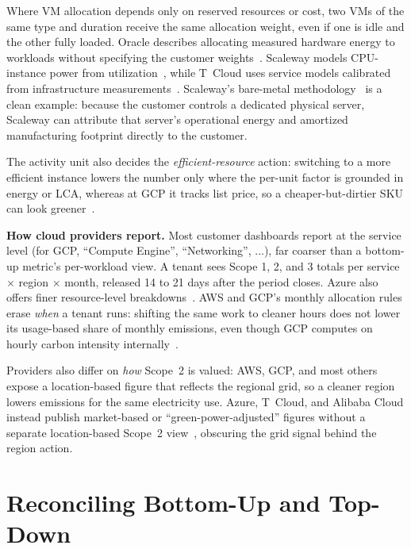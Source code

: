 \documentclass[sigconf,screen,nonacm]{acmart}
\newcommand{\parag}[1]{\vspace{2mm}\noindent\textbf{#1.}\hspace{2mm}}
\begin{document}
Where VM allocation depends only on reserved resources or cost, two VMs of the same type and duration receive the same allocation weight, even if one is idle and the other fully loaded.
Oracle describes allocating measured hardware energy to workloads without specifying the customer weights~\cite{oracle-emissions-management}.
Scaleway models CPU-instance power from utilization~\cite{scaleway-instances-footprint}, while T~Cloud uses service models calibrated from infrastructure measurements~\cite{tcloud-sustainability-release,tcloud-sustainability-dashboard}.
Scaleway's bare-metal methodology~\cite{scaleway-baremetal-footprint} is a clean example: because the customer controls a dedicated physical server, Scaleway can attribute that server’s operational energy and amortized manufacturing footprint directly to the customer.

The activity unit also decides the \emph{efficient-resource} action: switching to a more efficient instance lowers the number only where the per-unit factor is grounded in energy or LCA, whereas at GCP it tracks list price, so a cheaper-but-dirtier SKU can look greener~\cite{schneider-mattia-2024}.

\parag{How cloud providers report}
Most customer dashboards report at the service level (for GCP, ``Compute Engine'', ``Networking'', ...), far coarser than a bottom-up metric's per-workload view.
A tenant sees Scope 1, 2, and 3 totals per service $\times$ region $\times$ month, released 14 to 21 days after the period closes.
Azure also offers finer resource-level breakdowns~\cite{azure-carbon-overview}.
AWS and GCP's monthly allocation rules erase \emph{when} a tenant runs: shifting the same work to cleaner hours does not lower its usage-based share of monthly emissions, even though GCP computes on hourly carbon intensity internally~\cite{aws-ccft-model3,schneider-mattia-2024}.

Providers also differ on \emph{how} Scope~2 is valued: AWS, GCP, and most others expose a location-based figure that reflects the regional grid, so a cleaner region lowers emissions for the same electricity use.
Azure, T~Cloud, and Alibaba Cloud instead publish market-based or ``green-power-adjusted'' figures without a separate location-based Scope~2 view~\cite{azure-carbon-data,tcloud-sustainability-dashboard,alibaba-cloud-carbon-footprint}, obscuring the grid signal behind the region action.

\section{Reconciling Bottom-Up and Top-Down}
\label{sec:rsci}
\end{document}
